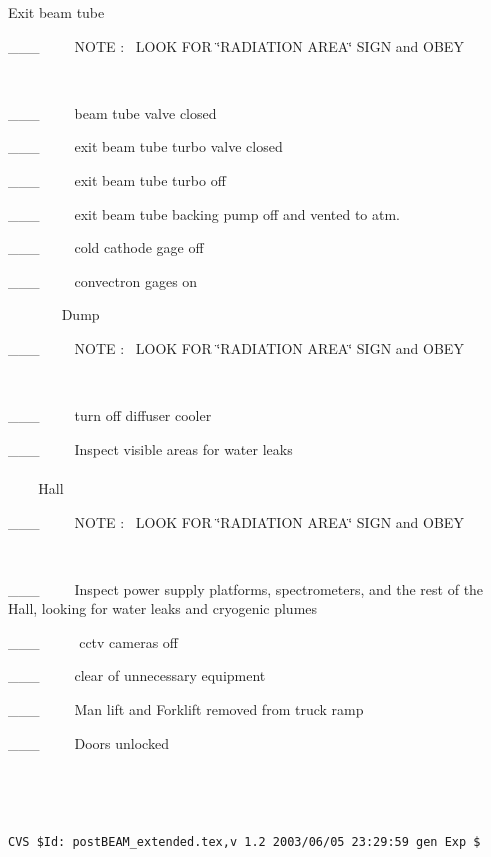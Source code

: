Exit beam tube

\_\_\_~~~~~NOTE :~ LOOK FOR \char`\"{}RADIATION AREA\char`\"{} SIGN and OBEY

~

\_\_\_~~~~~beam tube valve closed 

\_\_\_~~~~~exit beam tube turbo valve closed

\_\_\_~~~~~exit beam tube turbo off 

\_\_\_~~~~~exit beam tube backing pump off and vented to atm.

\_\_\_~~~~~cold cathode gage off

\_\_\_~~~~~convectron gages on

~
~
~
~
~Dump

\_\_\_~~~~~NOTE :~ LOOK FOR \char`\"{}RADIATION AREA\char`\"{} SIGN and OBEY

~

\_\_\_~~~~~turn off diffuser cooler

\_\_\_~~~~~Inspect visible areas for water leaks
\\
\\
~
~
~Hall 

\_\_\_~~~~~NOTE :~ LOOK FOR \char`\"{}RADIATION AREA\char`\"{} SIGN and OBEY

~

\_\_\_~~~~~Inspect power supply platforms, spectrometers, and the rest of the
Hall, looking for water leaks and cryogenic plumes

\_\_\_~~~~~ cctv cameras off

\_\_\_~~~~~clear of unnecessary equipment

\_\_\_~~~~~Man lift and Forklift removed from truck ramp

\_\_\_~~~~~Doors unlocked

~

~

%
%
{\small
\begin{verbatim}CVS $Id: postBEAM_extended.tex,v 1.2 2003/06/05 23:29:59 gen Exp $\end{verbatim}
}
